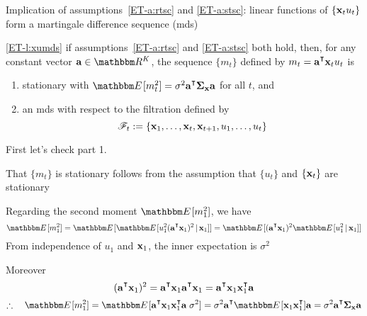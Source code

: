 \begin{frame}

    \vspace{2em}
    Implication of assumptions~\ref{ET-a:rtsc} and \ref{ET-a:stsc}:
    linear functions of $\{{\mathbf x}_t u_t\}$ form a martingale difference sequence
    ({\sc mds})
    
    \vspace{.7em}
    \Lem
        \eqref{ET-l:xumds}
        if assumptions~\ref{ET-a:rtsc} and \ref{ET-a:stsc} both hold, then, for any
        constant vector $\bolda \in \RR^K$, the sequence $\{m_t\}$ defined by
        $m_t = \bolda^\T \boldx_t u_t$ is 
        \begin{enumerate}
            \item stationary with $\EE[m_t^2] = \sigma^2  \bolda^\T
                \Sigmax \bolda$ for all $t$, and
            \item an {\sc mds} with respect to the filtration
                defined by
                \begin{equation*}
                    \label{eq:deffil}
                    \mathscr F_t := \{{\mathbf x}_1,\ldots,{\mathbf x}_t, {\mathbf x}_{t+1}, u_1, \ldots, u_t\}
                \end{equation*}
        \end{enumerate}
        
\end{frame}

\begin{frame}
    
    \vspace{2em}
    \Prf 
    
    First let's check part 1.
    
    That $\{m_t\}$ is stationary
    follows from the assumption that $\{u_t\}$ and $\{{\mathbf x}_t\}$ are
    stationary
    
    \vspace{.7em}
    Regarding the second moment $\EE[m_1^2]$, we
    have 
    \begin{equation*}
        \EE[m_1^2] 
        = \EE [ \EE[ u_1^2 (\bolda^\T \boldx_1)^2 \given \boldx_1]]
        = \EE [ (\bolda^\T \boldx_1)^2 \EE[ u_1^2 \given \boldx_1]]
    \end{equation*}
    From independence of $u_1$ and ${\mathbf x}_1$, the inner expectation is
    $\sigma^2$
    
    Moreover
    \begin{equation*}
        (\bolda^\T \boldx_1)^2 = \bolda^\T \boldx_1 \bolda^\T \boldx_1 
            =  \bolda^\T \boldx_1 \boldx_1^\T \bolda
    \end{equation*}
    \begin{equation*}
        \fore
        \EE[m_1^2] 
        = \EE [ \bolda^\T \boldx_1 \boldx_1^\T  \bolda \; \sigma^2 ]
        = \sigma^2  \bolda^\T \EE [ \boldx_1 \boldx_1^\T ] \bolda 
        = \sigma^2  \bolda^\T \Sigmax \bolda 
    \end{equation*}
    
\end{frame}

